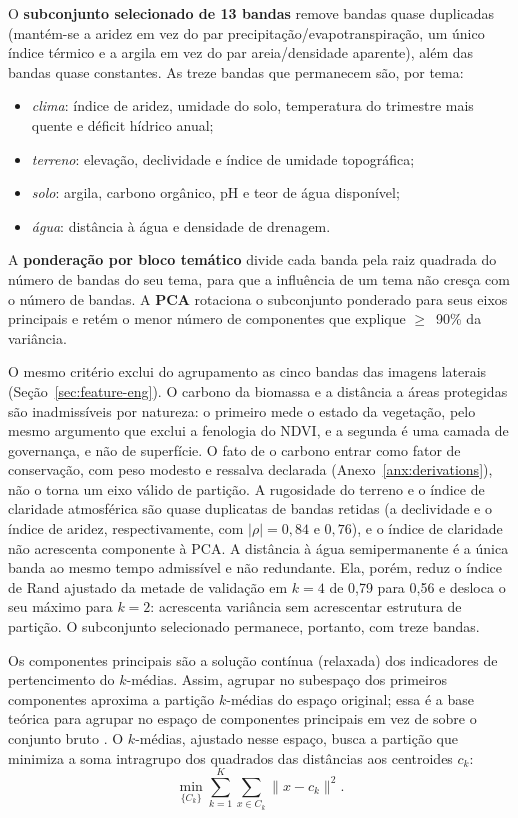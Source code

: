 O \textbf{subconjunto selecionado de 13 bandas} remove bandas quase duplicadas (mantém-se a aridez em vez
do par precipitação/evapotranspiração, um único índice térmico e a argila em vez do par
areia/densidade aparente), além das bandas quase constantes. As treze bandas que permanecem são, por
tema:
\begin{itemize}
  \item \emph{clima}: índice de aridez, umidade do solo, temperatura do trimestre mais quente e
    déficit hídrico anual;
  \item \emph{terreno}: elevação, declividade e índice de umidade topográfica;
  \item \emph{solo}: argila, carbono orgânico, pH e teor de água disponível;
  \item \emph{água}: distância à água e densidade de drenagem.
\end{itemize}
A \textbf{ponderação por bloco temático} divide cada banda pela raiz quadrada do número de bandas do seu
tema, para que a influência de um tema não cresça com o número de bandas. A \textbf{PCA} rotaciona o
subconjunto ponderado para seus eixos principais e retém o menor número de componentes que explique
$\geq$~90\% da variância.

O mesmo critério exclui do agrupamento as cinco bandas das imagens laterais
(Seção~\ref{sec:feature-eng}). O carbono da biomassa e a distância a áreas protegidas são
inadmissíveis por natureza: o primeiro mede o estado da vegetação, pelo mesmo argumento que exclui
a fenologia do NDVI, e a segunda é uma camada de governança, e não de superfície. O fato de o carbono
entrar como fator de conservação, com peso modesto e ressalva declarada (Anexo~\ref{anx:derivations}),
não o torna um eixo válido de partição. A rugosidade do terreno e o índice de claridade atmosférica
são quase duplicatas de bandas retidas (a declividade e o índice de aridez, respectivamente, com
$|\rho| = 0{,}84$ e $0{,}76$), e o índice de claridade não acrescenta componente à PCA. A distância à
água semipermanente é a única banda ao mesmo tempo admissível e não redundante. Ela, porém, reduz o
índice de Rand ajustado da metade de validação em $k = 4$ de 0,79 para 0,56 e desloca o seu máximo
para $k = 2$: acrescenta variância sem acrescentar estrutura de partição. O subconjunto selecionado
permanece, portanto, com treze bandas.

Os componentes principais são a solução contínua (relaxada) dos indicadores de pertencimento do
$k$-médias. Assim, agrupar no subespaço dos primeiros componentes aproxima a partição $k$-médias do
espaço original; essa é a base teórica para agrupar no espaço de componentes principais em vez de
sobre o conjunto bruto \citep[Teorema~3.1]{ding_k-means_2004}. O $k$-médias, ajustado nesse espaço,
busca a partição que minimiza a soma intragrupo dos quadrados das distâncias aos centroides $c_k$:
\begin{equation*}
  \min_{\{C_k\}} \sum_{k=1}^{K} \sum_{x \in C_k} \lVert x - c_k \rVert^2.
\end{equation*}

